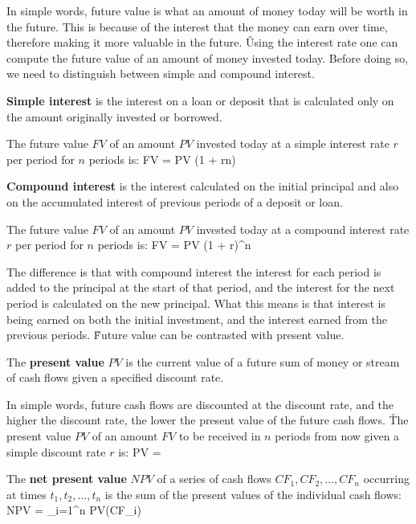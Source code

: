 In simple words, future value is what an amount of money today will be worth in the future. This is because of the
interest that the money can earn over time, therefore making it more valuable in the future. \v

Using the interest rate one can compute the future value of an amount of money invested today. Before doing so, we
need to distinguish between simple and compound interest.

\textbf{Simple interest} is the interest on a loan or deposit that is calculated only on the amount originally
invested or borrowed.
\ed

The future value $FV$ of an amount $PV$ invested today at a simple interest rate $r$ per period for $n$ periods is:
\bse
FV = PV \cdot (1 + rn)
\ese

\textbf{Compound interest} is the interest calculated on the initial principal and also on the accumulated interest
of previous periods of a deposit or loan.
\ed

The future value $FV$ of an amount $PV$ invested today at a compound interest rate $r$ per period for $n$ periods is:
\bse
FV = PV \cdot (1 + r)^n
\ese

The difference is that with compound interest the interest for each period is added to the principal at the start of
that period, and the interest for the next period is calculated on the new principal. What this means is that
interest is being earned on both the initial investment, and the interest earned from the previous periods. \v

Future value can be contrasted with present value.

The \textbf{present value} $PV$ is the current value of a future sum of money or stream of cash flows given a specified
discount rate.
\ed

In simple words, future cash flows are discounted at the discount rate, and the higher the discount rate, the lower
the present value of the future cash flows. \v

The present value $PV$ of an amount $FV$ to be received in $n$ periods from now given a simple discount rate $r$ is:
\bse
PV = 
\ese










The \textbf{net present value} $NPV$ of a series of cash flows $CF_1, CF_2, \ldots, CF_n$ occurring at times
$t_1, t_2, \ldots, t_n$ is the sum of the present values of the individual cash flows:
\bse
NPV = \sum_{i=1}^n PV(CF_i)
\ese
\ed





